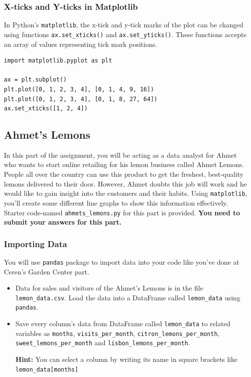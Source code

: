 \documentclass[a4paper]{article}
\begin{document}
\subsubsection{X-ticks and Y-ticks in Matplotlib}
In Python’s \texttt{matplotlib}, the x-tick and y-tick marks of the plot can be changed using functions \texttt{ax.set\_xticks()} and \texttt{ax.set\_yticks()}. These functions accepts an array of values representing tick mark positions.

\begin{lstlisting}
import matplotlib.pyplot as plt

ax = plt.subplot()
plt.plot([0, 1, 2, 3, 4], [0, 1, 4, 9, 16])
plt.plot([0, 1, 2, 3, 4], [0, 1, 8, 27, 64])
ax.set_xticks([1, 2, 4])
\end{lstlisting}{}

\subsection{Ahmet's Lemons}
In this part of the assignment, you will be acting as a data analyst for Ahmet who wants to start online retailing for his lemon business called Ahmet Lemons. People all over the country can use this product to get the freshest, best-quality lemons delivered to their door. However, Ahmet doubts this job will work and he would like to gain insight into the customers and their habits. Using \texttt{matplotlib}, you’ll create some different line graphs to show this information effectively. Starter code-named \texttt{ahmets\_lemons.py} for this part is provided. \textbf{You need to submit your answers for this part.}

\subsubsection{Importing Data}
You will use \texttt{pandas} package to import data into your code like you've done at Ceren's Garden Center part.

\begin{itemize}
\item 
Data for sales and visitors of the Ahmet's Lemons is in the file \texttt{lemon\_data.csv}. Load the data into a DataFrame called \texttt{lemon\_data} using \texttt{pandas}.

\item
Save every column's data from DataFrame called \texttt{lemon\_data} to related variables as \texttt{months}, \texttt{visits\_per\_month}, \texttt{citron\_lemons\_per\_month}, \\ \texttt{sweet\_lemons\_per\_month} and \texttt{lisbon\_lemons\_per\_month}.

\textbf{Hint:} You can select a column by writing its name in square brackets like \texttt{lemon\_data[\textquotesingle months\textquotesingle]}

\end{itemize}{}
\end{document}
